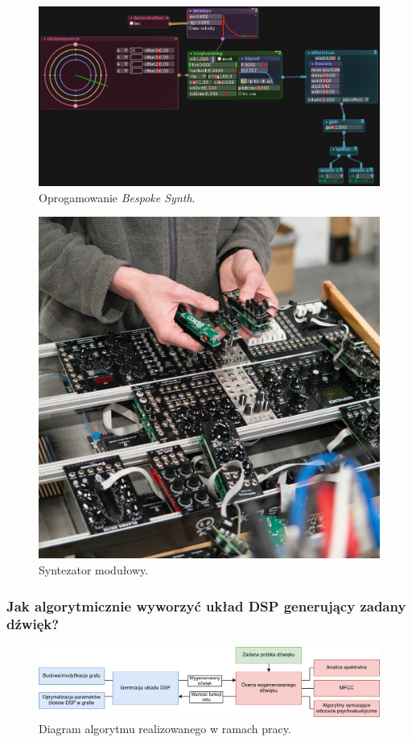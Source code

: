 \documentclass[]{beamer}
\begin{document}
\begin{frame}
  \begin{multicols}{2}
  \begin{figure}
    \centering
    \includegraphics[width=1.0\linewidth]{bespoke.png}
    \caption{Oprogamowanie \textit{Bespoke Synth}.}
  \end{figure}

  \begin{figure}
    \centering
    \includegraphics[width=0.8\linewidth]{modular-synth.jpg}
    \caption{Syntezator modułowy.}
  \end{figure}
  \end{multicols}
\end{frame}

\begin{frame}
  \frametitle{Jak algorytmicznie wyworzyć układ DSP generujący zadany dźwięk?}

  \begin{figure}
    \centering
    \includegraphics[width=1.0\linewidth]{algorithm-diagram.png}
    \caption{Diagram algorytmu realizowanego w ramach pracy.}
  \end{figure}
\end{frame}
\end{document}
